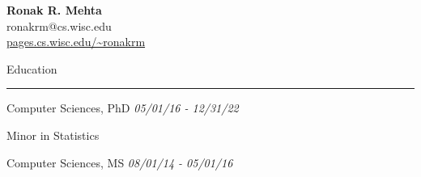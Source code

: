 \documentclass[]{article}
\title{}
\author{}
\date{}
\begin{document}
\begin{center}
	{\Huge\bf Ronak R. Mehta} \\
	\vspace{5pt}
	{\large%
	ronakrm@cs.wisc.edu \\
	\url{pages.cs.wisc.edu/~ronakrm} }
\end{center}



\vspace{20pt}
{\LARGE Education}
\vspace{3pt}
\hrule
\vspace{10pt}


	{Computer Sciences, PhD \hfill \textit{05/01/16 - 12/31/22}} 
	
	\qquad Minor in Statistics
		
	{Computer Sciences, MS \hfill \textit{08/01/14 - 05/01/16}}
	
\end{document}
